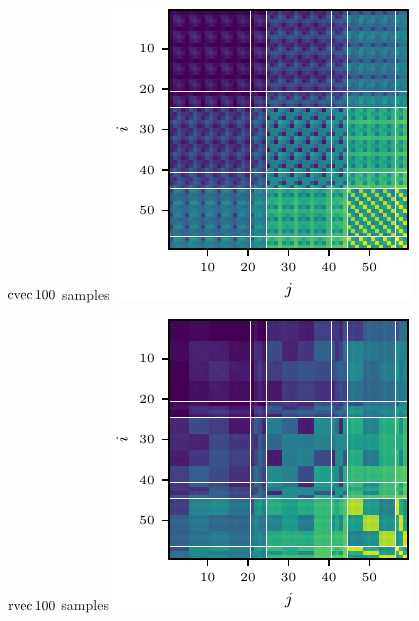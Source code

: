 \begin{figure}[!h]
\begin{minipage}[t]{0.49\linewidth}
  \end{minipage}
  \\
  \begin{minipage}[t]{0.49\linewidth}
    \centering
    $\operatorname{cvec} 100$ samples\vspace{1ex}
    \includegraphics[width=1.0\linewidth]{../kfs/plots/synthetic_cvec_mcfisher_100.pdf}
  \end{minipage}
  \hfill
  \begin{minipage}[t]{0.49\linewidth}
    \centering
    $\operatorname{rvec} 100$ samples\vspace{1ex}
    \includegraphics[width=1.0\linewidth]{../kfs/plots/synthetic_rvec_mcfisher_100.pdf}

\end{minipage}
\end{figure}

